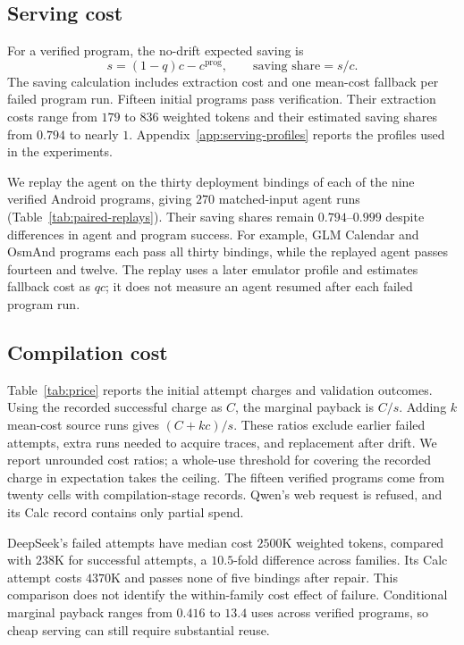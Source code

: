 \subsection{Serving cost}
\label{sec:share}

For a verified program, the no-drift expected saving is
\begin{equation}
s=(1-q)c-c^{\mathrm{prog}},\qquad\text{saving share}=s/c.
\label{eq:saving}
\end{equation}
The saving calculation includes extraction cost and one mean-cost fallback per failed program run.
Fifteen initial programs pass verification.
Their extraction costs range from $179$ to $836$ weighted tokens and their estimated saving shares from $0.794$ to nearly $1$.
Appendix~\ref{app:serving-profiles} reports the profiles used in the experiments.

\label{sec:paired}
We replay the agent on the thirty deployment bindings of each of the nine verified Android programs, giving $270$ matched-input agent runs (Table~\ref{tab:paired-replays}).
Their saving shares remain $0.794$--$0.999$ despite differences in agent and program success.
For example, GLM Calendar and OsmAnd programs each pass all thirty bindings, while the replayed agent passes fourteen and twelve.
The replay uses a later emulator profile and estimates fallback cost as $qc$; it does not measure an agent resumed after each failed program run.



\subsection{Compilation cost}
\label{sec:price}

Table~\ref{tab:price} reports the initial attempt charges and validation outcomes.
Using the recorded successful charge as $C$, the marginal payback is $C/s$.
Adding $k$ mean-cost source runs gives $(C+kc)/s$.
These ratios exclude earlier failed attempts, extra runs needed to acquire traces, and replacement after drift.
We report unrounded cost ratios; a whole-use threshold for covering the recorded charge in expectation takes the ceiling.
The fifteen verified programs come from twenty cells with compilation-stage records.
Qwen's web request is refused, and its Calc record contains only partial spend.



DeepSeek's failed attempts have median cost $2500$K weighted tokens, compared with $238$K for successful attempts, a $10.5$-fold difference across families.
Its Calc attempt costs $4370$K and passes none of five bindings after repair.
This comparison does not identify the within-family cost effect of failure.
Conditional marginal payback ranges from $0.416$ to $13.4$ uses across verified programs, so cheap serving can still require substantial reuse.

